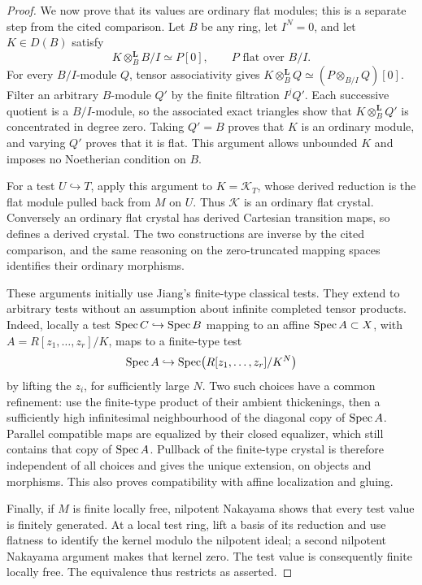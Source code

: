 \begin{proof}
We now prove that its values are ordinary flat modules; this is a separate step from the cited comparison.  Let $B$ be any ring, let $I^N=0$, and let $K\in D(B)$ satisfy
\[
          K\otimes_B^{\mathbf L}B/I\simeq P[0],
          \qquad P\text{ flat over }B/I.
\]
For every $B/I$-module $Q$, tensor associativity gives
$K\otimes_B^{\mathbf L}Q\simeq(P\otimes_{B/I}Q)[0]$.
Filter an arbitrary $B$-module $Q'$ by the finite filtration $I^jQ'$.  Each successive quotient is a $B/I$-module, so the associated exact triangles show that $K\otimes_B^{\mathbf L}Q'$ is concentrated in degree zero.  Taking $Q'=B$ proves that $K$ is an ordinary module, and varying $Q'$ proves that it is flat.  This argument allows unbounded $K$ and imposes no Noetherian condition on $B$.

For a test $U\hookrightarrow T$, apply this argument to $K=\mathcal K_T$, whose derived reduction is the flat module pulled back from $M$ on $U$.  Thus $\mathcal K$ is an ordinary flat crystal.  Conversely an ordinary flat crystal has derived Cartesian transition maps, so defines a derived crystal.  The two constructions are inverse by the cited comparison, and the same reasoning on the zero-truncated mapping spaces identifies their ordinary morphisms.

These arguments initially use Jiang's finite-type classical tests.  They extend to arbitrary tests without an assumption about infinite completed tensor products.  Indeed, locally a test $\operatorname{Spec} C\hookrightarrow\operatorname{Spec} B$ mapping to an affine $\operatorname{Spec} A\subset X$, with $A=R[z_1,\ldots,z_r]/K$, maps to a finite-type test
\[
 \operatorname{Spec} A\hookrightarrow\operatorname{Spec}\bigl(R[z_1,\ldots,z_r]/K^N\bigr)
\]
by lifting the $z_i$, for sufficiently large $N$.  Two such choices have a common refinement: use the finite-type product of their ambient thickenings, then a sufficiently high infinitesimal neighbourhood of the diagonal copy of $\operatorname{Spec} A$.  Parallel compatible maps are equalized by their closed equalizer, which still contains that copy of $\operatorname{Spec} A$.  Pullback of the finite-type crystal is therefore independent of all choices and gives the unique extension, on objects and morphisms.  This also proves compatibility with affine localization and gluing.

Finally, if $M$ is finite locally free, nilpotent Nakayama shows that every test value is finitely generated.  At a local test ring, lift a basis of its reduction and use flatness to identify the kernel modulo the nilpotent ideal; a second nilpotent Nakayama argument makes that kernel zero.  The test value is consequently finite locally free.  The equivalence thus restricts as asserted.
\end{proof}

